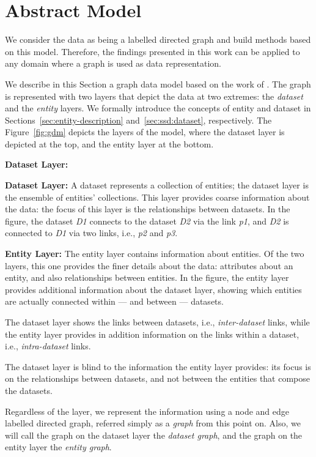 \section{Abstract Model}
\label{chap:ssd:gdm:abstract-model}

We consider the data as being a labelled directed graph and build methods based on this model. Therefore, the findings presented in this work can be applied to any domain where a graph is used as data representation.

We describe in this Section a graph data model based on the work of \cite{delbru:jws:entity}. The graph is represented with two layers that depict the data at two extremes: the \emph{dataset} and the \emph{entity} layers. We formally introduce the concepts of entity and dataset in Sections~\ref{sec:entity-description} and~\ref{sec:ssd:dataset}, respectively. The Figure~\ref{fig:gdm} depicts the layers of the model, where the dataset layer is depicted at the top, and the entity layer at the bottom.
\begin{labeling}{\textbf{Dataset Layer:}}
	\item[\textbf{Dataset Layer:}] A dataset represents a collection of entities; the dataset layer is the ensemble of entities' collections. This layer provides coarse information about the data: the focus of this layer is the relationships between datasets. In the figure, the dataset \emph{D1} connects to the dataset \emph{D2} via the link \emph{p1}, and \emph{D2} is connected to \emph{D1} via two links, i.e., \emph{p2} and \emph{p3}.
	\item[\textbf{Entity Layer:}] The entity layer contains information about entities. Of the two layers, this one provides the finer details about the data: attributes about an entity, and also relationships between entities. In the figure, the entity layer provides additional information about the dataset layer, showing which entities are actually connected within --- and between --- datasets.
\end{labeling}

The dataset layer shows the links between datasets, i.e., \emph{inter-dataset} links, while the entity layer provides in addition information on the links within a dataset, i.e., \emph{intra-dataset} links.

The dataset layer is blind to the information the entity layer provides: its focus is on the relationships between datasets, and not between the entities that compose the datasets.

Regardless of the layer, we represent the information using a node and edge labelled directed graph, referred simply as a \emph{graph} from this point on. Also, we will call the graph on the dataset layer the \emph{dataset graph}, and the graph on the entity layer the \emph{entity graph}.

